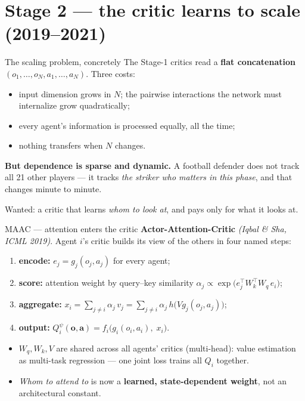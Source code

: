 \documentclass[10pt, aspectratio=169]{beamer}
\newcommand{\paper}[1]{\textcolor{mLightBrown}{\small\textit{(#1)}}}
\begin{document}
\section{Stage 2 --- the critic learns to scale (2019--2021)}

\begin{frame}{The scaling problem, concretely}
The Stage-1 critics read a \textbf{flat concatenation} $(o_1,\dots,o_N, a_1,\dots,a_N)$. Three costs:
\begin{itemize}\setlength\itemsep{2pt}
\item input dimension grows in $N$; the pairwise interactions the network must internalize grow \alert{quadratically};
\item every agent's information is processed \alert{equally, all the time};
\item nothing transfers when $N$ changes.
\end{itemize}
\medskip

\pause
\textbf{But dependence is sparse and dynamic.} A football defender does not track all 21 other players --- it tracks \emph{the striker who matters in this phase}, and that changes minute to minute.
\medskip

\pause
\begin{center}
\alert{Wanted: a critic that learns \emph{whom to look at}, and pays only for what it looks at.}
\end{center}
\end{frame}

\begin{frame}{MAAC --- attention enters the critic}
\textbf{Actor-Attention-Critic} \paper{Iqbal \& Sha, ICML 2019}. \; Agent $i$'s critic builds its view of the others in four named steps:
\medskip
\begin{enumerate}\setlength\itemsep{2pt}
\item \textbf{encode:} $e_j = g_j(o_j, a_j)$ for every agent;
\item \textbf{score:} attention weight by query--key similarity \quad $\alpha_j \propto \exp\!\big( e_j^{\top} W_k^{\top} W_q\, e_i \big)$;
\item \textbf{aggregate:} $x_i = \sum_{j\neq i} \alpha_j\, v_j = \sum_{j\neq i} \alpha_j\, h\big(V g_j(o_j,a_j)\big)$;
\item \textbf{output:} $Q_i^{\psi}(\mathbf{o},\mathbf{a}) = f_i\big( g_i(o_i,a_i),\; x_i \big)$.
\end{enumerate}
\medskip

\pause
\begin{itemize}\setlength\itemsep{1pt}
\item $W_q, W_k, V$ are \alert{shared across all agents' critics} (multi-head): value estimation as multi-task regression --- one joint loss trains all $Q_i$ together.
\item \emph{Whom to attend to} is now a \textbf{learned, state-dependent weight}, not an architectural constant.
\end{itemize}
\end{frame}
\end{document}
